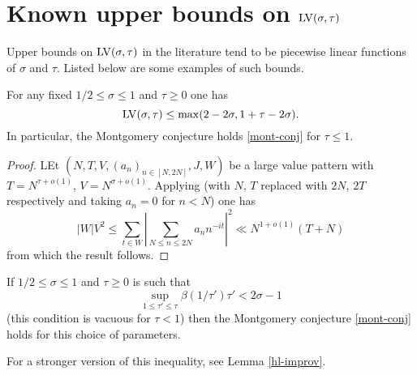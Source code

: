 \section{Known upper bounds on \texorpdfstring{$\mathrm{LV}(\sigma,\tau)$}{LV(sigma,tau)}}

Upper bounds on $\mathrm{LV}(\sigma,\tau)$ in the literature tend to be piecewise linear functions of $\sigma$ and $\tau$.  Listed below are some examples of such bounds.

\begin{theorem}\label{l2-mvt} For any fixed $1/2 \leq \sigma \leq 1$ and $\tau\geq 0$ one has
    $$ \mathrm{LV}(\sigma,\tau) \leq \max( 2-2\sigma, 1 + \tau - 2 \sigma).$$
In particular, the Montgomery conjecture holds \eqref{mont-conj} for $\tau \leq 1$.
\end{theorem}


\begin{proof}
LEt $(N,T,V,(a_n)_{n \in [N,2N]},J,W)$ be a large value pattern with $T = N^{\tau + o(1)}$, $V = N^{\sigma + o(1)}$. Applying \cite[Theorem~9.4]{ik} (with $N$, $T$ replaced with $2N$, $2T$ respectively and taking $a_n = 0$ for $n < N$) one has
\[
|W|V^2 \le \sum_{t \in W} \left|\sum_{N \le n \le 2N} a_n n^{-it}\right|^2 \ll N^{1 + o(1)}(T + N)
\]
from which the result follows.
\end{proof}

\begin{theorem}\label{montgomery-lv} If $1/2 \leq \sigma \leq 1$ and $\tau \geq 0$ is such that
\begin{equation}\label{tab}
\sup_{1 \leq \tau' \leq \tau} \beta(1/\tau') \tau' < 2\sigma - 1
\end{equation}
(this condition is vacuous for $\tau < 1$) then the Montgomery conjecture \eqref{mont-conj} holds for this choice of parameters.
\end{theorem}

For a stronger version of this inequality, see Lemma \ref{hl-improv}.

